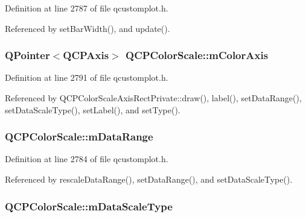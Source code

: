 Definition at line 2787 of file qcustomplot.\+h.



Referenced by set\+Bar\+Width(), and update().

\hypertarget{class_q_c_p_color_scale_a2efbc90fd31898fe05d2b74a8422b1d5}{}
\subsubsection[{m\+Color\+Axis}]{\setlength{\rightskip}{0pt plus 5cm}Q\+Pointer$<${\bf Q\+C\+P\+Axis}$>$ Q\+C\+P\+Color\+Scale\+::m\+Color\+Axis\hspace{0.3cm}{\ttfamily [protected]}}\label{class_q_c_p_color_scale_a2efbc90fd31898fe05d2b74a8422b1d5}


Definition at line 2791 of file qcustomplot.\+h.



Referenced by Q\+C\+P\+Color\+Scale\+Axis\+Rect\+Private\+::draw(), label(), set\+Data\+Range(), set\+Data\+Scale\+Type(), set\+Label(), and set\+Type().

\hypertarget{class_q_c_p_color_scale_a5d4853feb32cd0077bb2b871687c844b}{}
\subsubsection[{m\+Data\+Range}]{ Q\+C\+P\+Color\+Scale\+::m\+Data\+Range\hspace{0.3cm}{\ttfamily [protected]}}\label{class_q_c_p_color_scale_a5d4853feb32cd0077bb2b871687c844b}


Definition at line 2784 of file qcustomplot.\+h.



Referenced by rescale\+Data\+Range(), set\+Data\+Range(), and set\+Data\+Scale\+Type().

\hypertarget{class_q_c_p_color_scale_a2754d6a78736f64a241e333fbd955372}{}
\subsubsection[{m\+Data\+Scale\+Type}]{ Q\+C\+P\+Color\+Scale\+::m\+Data\+Scale\+Type\hspace{0.3cm}{\ttfamily [protected]}}\label{class_q_c_p_color_scale_a2754d6a78736f64a241e333fbd955372}


